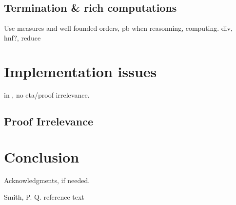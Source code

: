\documentclass[preprint,10pt]{sigplanconf}
\begin{document}
\subsection{Termination \& rich computations}
\label{sec:Practice:Computations}
Use measures and well founded orders, pb when reasonning, computing.
div, hnf?, reduce

\section{Implementation issues}
\label{sec:Implementation}
in \Coq, no eta/proof irrelevance. 


\subsection{Proof Irrelevance}

\section{Conclusion}
\label{sec:Conclusion}



\acks

Acknowledgments, if needed.

\begin{thebibliography}{}

Smith, P. Q. reference text

\end{thebibliography}
\end{document}
